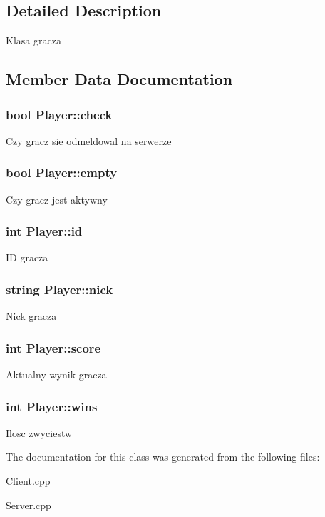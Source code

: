 \subsection{Detailed Description}
Klasa gracza 

\subsection{Member Data Documentation}
\hypertarget{classPlayer_a1b72316124caf757250c3cee1c4416ff}{
\subsubsection[{check}]{\setlength{\rightskip}{0pt plus 5cm}bool Player\-::check}}\label{classPlayer_a1b72316124caf757250c3cee1c4416ff}
Czy gracz sie odmeldowal na serwerze \hypertarget{classPlayer_a8039b9f17594c036c3bd7b676a24b19e}{
\subsubsection[{empty}]{\setlength{\rightskip}{0pt plus 5cm}bool Player\-::empty}}\label{classPlayer_a8039b9f17594c036c3bd7b676a24b19e}
Czy gracz jest aktywny \hypertarget{classPlayer_a05e05f3a23de78da7ec032ec2bcf8c6c}{
\subsubsection[{id}]{\setlength{\rightskip}{0pt plus 5cm}int Player\-::id}}\label{classPlayer_a05e05f3a23de78da7ec032ec2bcf8c6c}
I\-D gracza \hypertarget{classPlayer_aea2f8abddadf8deb423a3c9b507d1ccc}{
\subsubsection[{nick}]{\setlength{\rightskip}{0pt plus 5cm}string Player\-::nick}}\label{classPlayer_aea2f8abddadf8deb423a3c9b507d1ccc}
Nick gracza \hypertarget{classPlayer_ace6abae8d66534ad0a1fd6458f786a6e}{
\subsubsection[{score}]{\setlength{\rightskip}{0pt plus 5cm}int Player\-::score}}\label{classPlayer_ace6abae8d66534ad0a1fd6458f786a6e}
Aktualny wynik gracza \hypertarget{classPlayer_aba7987685c25a4189ae664e9748eecf0}{
\subsubsection[{wins}]{\setlength{\rightskip}{0pt plus 5cm}int Player\-::wins}}\label{classPlayer_aba7987685c25a4189ae664e9748eecf0}
Ilosc zwyciestw 

The documentation for this class was generated from the following files\-:\begin{DoxyCompactItemize}
\item 
Client.\-cpp\item 
Server.\-cpp\end{DoxyCompactItemize}
